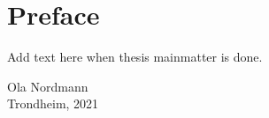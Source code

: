 \chapter*{Preface}
\noindent 
Add text here when thesis mainmatter is done. 
\lipsum[1]

\lipsum[1]
\begin{flushright}
    Ola Nordmann\\ 
    Trondheim, 2021
\end{flushright}